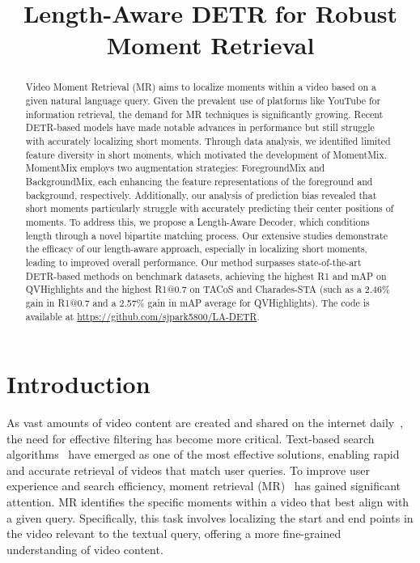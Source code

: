 \title{Length-Aware DETR for Robust Moment Retrieval}



\maketitle

\begin{abstract}
    Video Moment Retrieval (MR) aims to localize moments within a video based on a given natural language query.
    Given the prevalent use of platforms like YouTube for information retrieval, the demand for MR techniques is significantly growing.
    Recent DETR-based models have made notable advances in performance but still struggle with accurately localizing short moments.
    Through data analysis, we identified limited feature diversity in short moments, which motivated the development of MomentMix. MomentMix employs two augmentation strategies: ForegroundMix and BackgroundMix, each enhancing the feature representations of the foreground and background, respectively. Additionally, our analysis of prediction bias revealed that short moments particularly struggle with accurately predicting their center positions of moments. To address this, we propose a Length-Aware Decoder, which conditions length through a novel bipartite matching process.
    Our extensive studies demonstrate the efficacy of our length-aware approach, especially in localizing short moments, leading to improved overall performance.
    Our method surpasses state-of-the-art DETR-based methods on benchmark datasets, achieving the highest R1 and mAP on QVHighlights and the highest R1@0.7 on TACoS and Charades-STA (such as a 2.46\% gain in R1@0.7 and a 2.57\% gain in mAP average for QVHighlights). The code is available at \url{https://github.com/sjpark5800/LA-DETR}.
    
\end{abstract}

\section{Introduction}
\label{sec:introduction}

As vast amounts of video content are created and shared on the internet daily~\cite{cheng2013understanding_YouTube}, the need for effective filtering has become more critical. Text-based search algorithms~\cite{boyer1977fast_search_matching} have emerged as one of the most effective solutions, enabling rapid and accurate retrieval of videos that match user queries. 
To improve user experience and search efficiency, moment retrieval (MR)~\cite{anne2017localizing,gao2017tall_tall} has gained significant attention. MR identifies the specific moments within a video that best align with a given query. Specifically, this task involves localizing the start and end points in the video relevant to the textual query, offering a more fine-grained understanding of video content.

